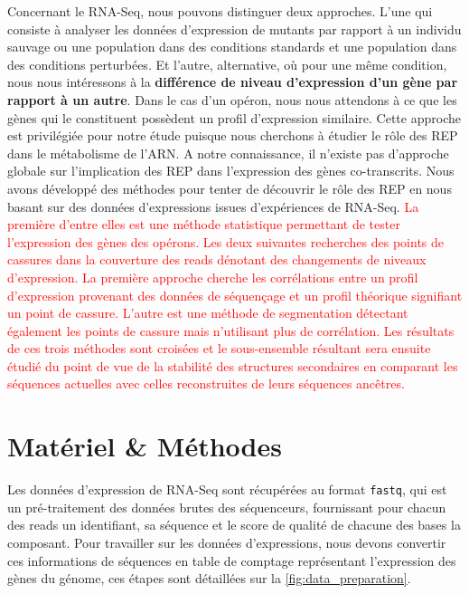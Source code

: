 \documentclass[12pt,a4paper]{report}
\begin{document}
\begin{onehalfspace}
Concernant le RNA-Seq, nous pouvons distinguer deux approches. L'une qui consiste à analyser les données d'expression de mutants par rapport à un individu sauvage ou une population dans des conditions standards et une population dans des conditions perturbées. Et l'autre, alternative, où pour une même condition, nous nous intéressons à la \textbf{différence de niveau d'expression d'un gène par rapport à un autre}. Dans le cas d'un opéron, nous nous attendons à ce que les gènes qui le constituent possèdent un profil d'expression similaire. Cette approche est privilégiée pour notre étude puisque nous cherchons à étudier le rôle des REP dans le métabolisme de l'ARN.
A notre connaissance, il n'existe pas d'approche globale sur l'implication des REP dans l'expression des gènes co-transcrits. Nous avons développé des méthodes pour tenter de découvrir le rôle des REP en nous basant sur des données d'expressions issues d'expériences de RNA-Seq. \textcolor{red}{La première d'entre elles est une méthode statistique permettant de tester l'expression des gènes des opérons. Les deux suivantes recherches des points de cassures dans la couverture des reads dénotant des changements de niveaux d'expression. La première approche cherche les corrélations entre un profil d'expression provenant des données de séquençage et un profil théorique signifiant un point de cassure. L'autre est une méthode de segmentation détectant également les points de cassure mais n'utilisant plus de corrélation. Les résultats de ces trois méthodes sont croisées et le sous-ensemble résultant sera ensuite étudié du point de vue de la stabilité des structures secondaires en comparant les séquences actuelles avec celles reconstruites de leurs séquences ancêtres.}


\chapter*{Matériel \& Méthodes}

Les données d'expression de RNA-Seq sont récupérées au format \texttt{fastq}, qui est un pré-traitement des données brutes des séquenceurs, fournissant pour chacun des \gls{reads} un identifiant, sa séquence et le score de qualité de chacune des bases la composant. Pour travailler sur les données d'expressions, nous devons convertir ces informations de séquences en table de comptage représentant l'expression des gènes du génome, ces étapes sont détaillées sur la \autoref{fig:data_preparation}.


\end{onehalfspace}
\end{document}
